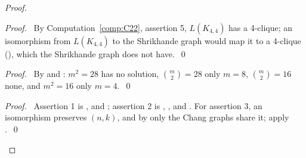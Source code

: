 \begin{proof}
 \begin{proof}\pf\ By Computation~\ref{comp:C22}, assertion 5, $L(K_{4,4})$ has a 4-clique; an
  isomorphism from $L(K_{4,4})$ to the Shrikhande graph would map it to a 4-clique
  (), which the Shrikhande graph does not have.~\qed\end{proof}
 \begin{proof}\pf\ By  and : $m^2=28$ has no solution,
  $\binom m2=28$ only $m=8$, $\binom m2=16$ none, and $m^2=16$ only $m=4$.~\qed\end{proof}
 \qedstep
 \begin{proof}\pf\ Assertion 1 is ,  and
  ; assertion 2 is , ,
   and . For assertion 3, an isomorphism preserves
  $(n,k)$, and by  only the Chang graphs share it; apply
  .~\qed\end{proof}
\end{proof}

